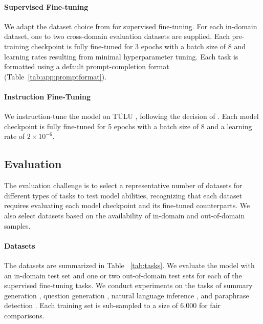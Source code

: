 \paragraph{Supervised Fine-tuning}
We adapt the dataset choice from \citealp{yang2024unveiling} for supervised fine-tuning. 
For each in-domain dataset, one to two cross-domain evaluation datasets are supplied.
Each pre-training checkpoint is fully fine-tuned for 3 epochs with a batch size of 8 and learning rates resulting from minimal hyperparameter tuning. 
Each task is formatted using a default prompt-completion format (Table~\ref{tab:app:promptformat}).

\paragraph{Instruction Fine-Tuning}
We instruction-tune the model on T\"{U}LU \cite{ivison2023camels}, following the decision of \citealp{groeneveld2024olmo}.
Each model checkpoint is fully fine-tuned for 5 epochs with a batch size of 8 and a learning rate of $2\times 10^{-6}$.


\subsection{Evaluation}
The evaluation challenge is to select a representative number of datasets for different types of tasks to test model abilities, recognizing that each dataset requires evaluating each model checkpoint and its fine-tuned counterparts. 
We also select datasets based on the availability of in-domain and out-of-domain samples.

\paragraph{Datasets}
The datasets are summarized in Table ~\ref{tab:tasks}.
We evaluate the model with an in-domain test set and one or two out-of-domain test sets for each of the supervised fine-tuning tasks.
We conduct experiments on the tasks of summary generation \cite{narayan-etal-2018-dont, hasan-etal-2021-xl, hermann2015teaching}, question generation \cite{sap-etal-2019-social, xiong-etal-2019-tweetqa, welbl2017crowdsourcing}, natural language inference \cite{williams-etal-2018-broad, wang-etal-2018-glue, dagan2006pascal, bar2006second, giampiccolo2007third, bentivogli2009fifth}, and paraphrase detection \cite{zhang-etal-2019-paws, wang-etal-2018-glue, agirre2007semantic}.
Each training set is sub-sampled to a size of 6,000 for fair comparisons.

